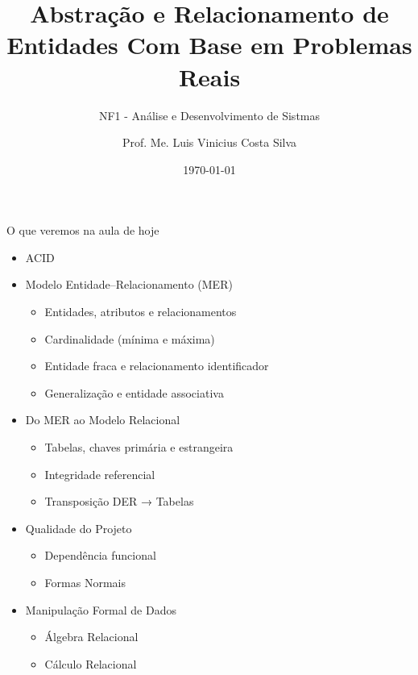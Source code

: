 \documentclass{beamer}
\title{Abstração e Relacionamento de Entidades
Com Base em Problemas Reais}
\subtitle{NF1 - Análise e Desenvolvimento  de Sistmas}
\author{Prof. Me. Luis Vinicius Costa Silva}
\date{\today}
\begin{document}
\frame{\titlepage}

\begin{frame}{O que veremos na aula de hoje}

\begin{itemize}
    \item ACID
    \item Modelo Entidade–Relacionamento (MER)
        \begin{itemize}
            \item Entidades, atributos e relacionamentos
            \item Cardinalidade (mínima e máxima)
            \item Entidade fraca e relacionamento identificador
            \item Generalização e entidade associativa
        \end{itemize}
        
    \item Do MER ao Modelo Relacional
        \begin{itemize}
            \item Tabelas, chaves primária e estrangeira
            \item Integridade referencial
            \item Transposição DER → Tabelas
        \end{itemize}
        
    \item Qualidade do Projeto
        \begin{itemize}
            \item Dependência funcional
            \item Formas Normais
        \end{itemize}
        
    \item Manipulação Formal de Dados
        \begin{itemize}
            \item Álgebra Relacional
            \item Cálculo Relacional
        \end{itemize}
\end{itemize}

\end{frame}









\end{document}
